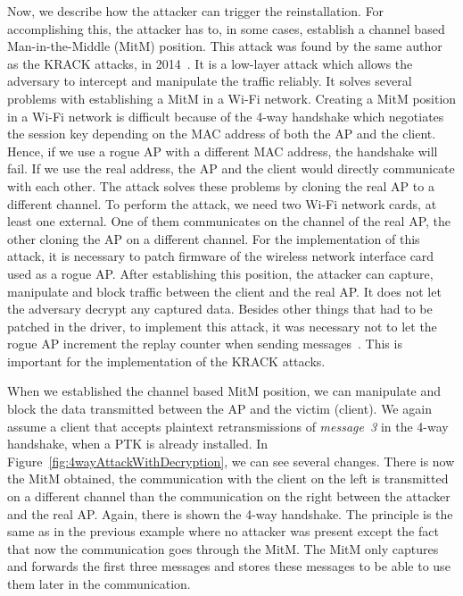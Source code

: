 Now, we describe how the attacker can trigger the reinstallation. For accomplishing this, the attacker has to, in some cases, establish a channel based Man-in-the-Middle (MitM) position. This attack was found by the same author as the KRACK attacks, in 2014~\cite{Vanhoef:2014}. It is a low-layer attack which allows the adversary to intercept and manipulate the traffic reliably. It solves several problems with establishing a MitM in a Wi-Fi network. Creating a MitM position in a Wi-Fi network is difficult because of the 4-way handshake which negotiates the session key depending on the MAC address of both the AP and the client. Hence, if we use a rogue AP with a different MAC address, the handshake will fail. If we use the real address, the AP and the client would directly communicate with each other. The attack solves these problems by cloning the real AP to a different channel. To perform the attack, we need two Wi-Fi network cards, at least one external. One of them communicates on the channel of the real AP, the other cloning the AP on a different channel. For the implementation of this attack, it is necessary to patch firmware of the wireless network interface card used as a rogue AP. After establishing this position, the attacker can capture, manipulate and block traffic between the client and the real AP. It does not let the adversary decrypt any captured data. Besides other things that had to be patched in the driver, to implement this attack, it was necessary not to let the rogue AP increment the replay counter when sending messages~\cite{Vanhoef:2014}. This is important for the implementation of the KRACK attacks.

When we established the channel based MitM position, we can manipulate and block the data transmitted between the AP and the victim (client). We again assume a client that accepts plaintext retransmissions of \textit{message~3} in the 4-way handshake, when a PTK is already installed. In Figure~\ref{fig:4wayAttackWithDecryption}, we can see several changes. There is now the MitM obtained, the communication with the client on the left is transmitted on a different channel than the communication on the right between the attacker and the real AP. Again, there is shown the 4-way handshake. The principle is the same as in the previous example where no attacker was present except the fact that now the communication goes through the MitM. The MitM only captures and forwards the first three messages and stores these messages to be able to use them later in the communication.


